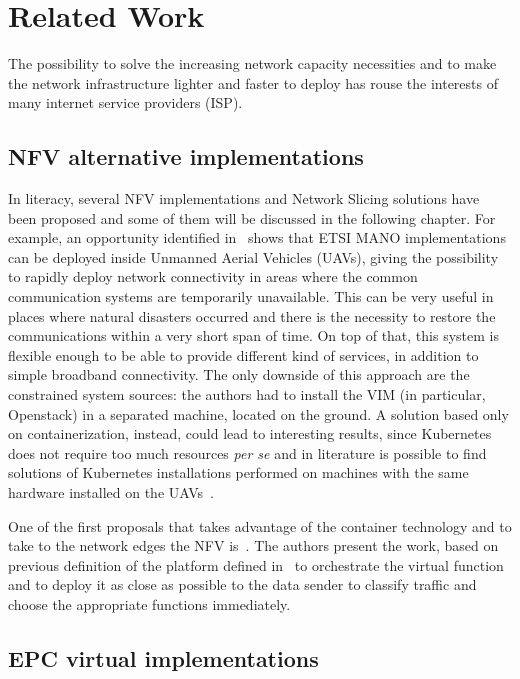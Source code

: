 \chapter{Related Work}
\label{chap:rel_wk}


The possibility to solve the increasing network capacity necessities and to make
the network infrastructure lighter and faster to deploy has rouse the interests
of many internet service providers (ISP).

\section{NFV alternative implementations}

In literacy, several NFV implementations and Network Slicing solutions have been
proposed and some of them will be discussed in the following chapter. For
example, an opportunity identified in~\cite{nogales2018nfv} shows that ETSI MANO
implementations can be deployed inside Unmanned Aerial Vehicles (UAVs), giving
the possibility to rapidly deploy network connectivity in areas where the common
communication systems are temporarily unavailable. This can be very useful in
places where natural disasters occurred and there is the necessity to restore
the communications within a very short span of time. On top of that, this system
is flexible enough to be able to provide different kind of services, in addition
to simple broadband connectivity. The only downside of this approach are the
constrained system sources: the authors had to install the VIM (in particular,
Openstack) in a separated machine, located on the ground. A solution based only
on containerization, instead, could lead to interesting results, since
Kubernetes does not require too much resources \textit{per se} and in literature
is possible to find solutions of Kubernetes installations performed on machines
with the same hardware installed on the UAVs~\cite{pahl2016container}.

One of the first proposals that takes advantage of the container technology and
to take to the network edges the NFV is~\cite{cziva2017container}. The authors
present the work, based on previous definition of the platform defined
in~\cite{cziva2015container} to orchestrate the virtual function and to deploy
it as close as possible to the data sender to classify traffic and choose the
appropriate functions immediately.

\section{EPC virtual implementations}

